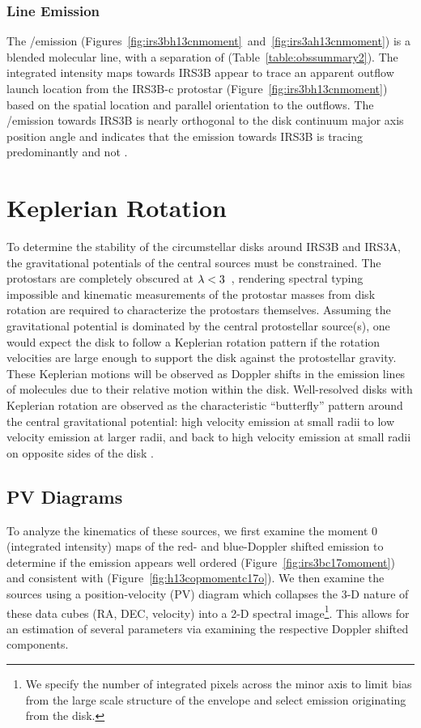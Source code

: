 \documentclass[twocolumn, 12pt, trackchanges]{aastex63}
\begin{document}
\subsubsection{\htcn\space Line Emission}\label{sec:htcnemission}
The \htcn/\sot\space emission (Figures~\ref{fig:irs3bh13cnmoment}~and~\ref{fig:irs3ah13cnmoment}) is a blended molecular line, with a separation of \space(Table~\ref{table:obssummary2}). The integrated intensity maps towards IRS3B appear to trace an apparent outflow launch location from the IRS3B-c protostar (Figure~\ref{fig:irs3bh13cnmoment}) based on the spatial location and parallel orientation to the outflows. The \htcn/\sot\space emission towards IRS3B is nearly orthogonal to the disk continuum major axis position angle and indicates that the emission towards IRS3B is tracing predominantly \sot\space and not \htcn.

\section{Keplerian Rotation}\label{sec:keprotation}

To determine the stability of the circumstellar disks around IRS3B and IRS3A, the gravitational potentials of the central sources must be constrained. The protostars are completely obscured at $\lambda\space<\space3$~\micron, rendering spectral typing impossible and kinematic measurements of the protostar masses from disk rotation are required to characterize the protostars themselves. Assuming the gravitational potential is dominated by the central protostellar source(s), one would expect the disk to follow a Keplerian rotation pattern if the rotation velocities are large enough to support the disk against the protostellar gravity. These Keplerian motions will be observed as Doppler shifts in the emission lines of molecules due to their relative motion within the disk. Well-resolved disks with Keplerian rotation are observed as the characteristic ``butterfly'' pattern around the central gravitational potential: high velocity emission at small radii to low velocity emission at larger radii, and back to high velocity emission at small radii on opposite sides of the disk \citep[e.g., ][]{2013ApJ...774...16R, 2018AA...609A..47P}.

\subsection{PV Diagrams}
To analyze the kinematics of these sources, we first examine the moment 0 (integrated intensity) maps of the red- and blue-Doppler shifted \cso\space emission to determine if the emission appears well ordered (Figure~\ref{fig:irs3bc17omoment}) and consistent with \htcop\space(Figure~\ref{fig:h13copmomentc17o}). We then examine the sources using a position-velocity (PV) diagram which collapses the 3-D nature of these data cubes (RA, DEC, velocity) into a 2-D spectral image\footnote{We specify the number of integrated pixels across the minor axis to limit bias from the large scale structure of the envelope and select emission originating from the disk.}. This allows for an estimation of several parameters via examining the respective Doppler shifted components. 
\end{document}
